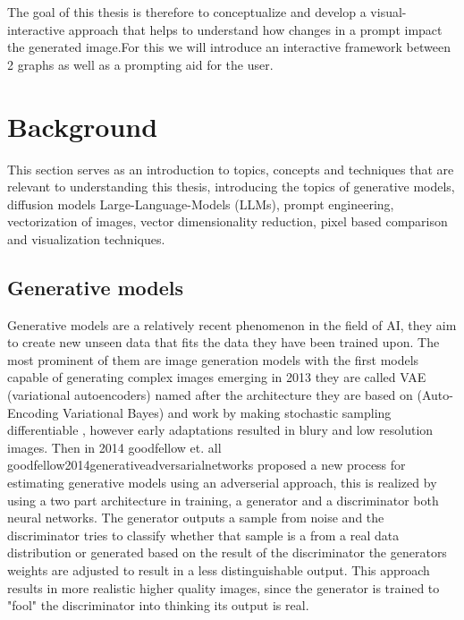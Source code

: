 \documentclass[
  a4paper,  %
  twoside,  %
  bibliography=totoc,
  headsepline,
  cleardoublepage=empty,
  parskip=half,
  draft=false
]{scrbook}
\begin{document}
The goal of this thesis is therefore to conceptualize and develop a visual-interactive approach that helps to understand how changes in a prompt impact the generated image.For this we will introduce an interactive framework between 2 graphs as well as a prompting aid for the user.\\

\chapter{Background}
\label{chap:k2}
This section serves as an introduction to topics, concepts and techniques that are relevant to understanding this thesis, introducing the topics of generative models, diffusion models Large-Language-Models (LLMs), prompt engineering, vectorization of images, vector dimensionality reduction, pixel based comparison and visualization techniques. 
\section{Generative models}


Generative models are a relatively recent phenomenon in the field of AI, they aim to create new unseen data that fits the data they have been trained upon. The most prominent of them are image generation models with the first models capable of generating complex images emerging in 2013 they are called VAE (variational autoencoders) named after the architecture they are based on (Auto-Encoding Variational Bayes) and work by making stochastic sampling differentiable \cite{kingma2022autoencodingvariationalbayes}, however early adaptations resulted in blury and low resolution images.
Then in 2014 goodfellow et. all {goodfellow2014generativeadversarialnetworks} proposed a new process for estimating generative models using an adverserial approach, this is realized by using a two part architecture in training, a generator and a discriminator both neural networks. The generator outputs a sample from noise and the discriminator tries to classify whether that sample is a from a real data distribution or generated based on the result of the discriminator the generators weights are adjusted to result in a less distinguishable output. This approach results in more realistic higher quality images, since the generator is trained to "fool" the discriminator into thinking its output is real. 
\end{document}

